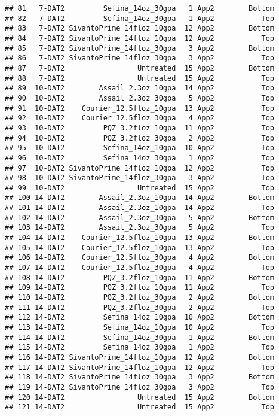 \documentclass[
]{article}
\begin{document}
\begin{verbatim}
## 81   7-DAT2         Sefina_14oz_30gpa   1 App2        Bottom
## 82   7-DAT2         Sefina_14oz_30gpa   1 App2           Top
## 83   7-DAT2 SivantoPrime_14floz_10gpa  12 App2        Bottom
## 84   7-DAT2 SivantoPrime_14floz_10gpa  12 App2           Top
## 85   7-DAT2 SivantoPrime_14floz_30gpa   3 App2        Bottom
## 86   7-DAT2 SivantoPrime_14floz_30gpa   3 App2           Top
## 87   7-DAT2                 Untreated  15 App2        Bottom
## 88   7-DAT2                 Untreated  15 App2           Top
## 89  10-DAT2        Assail_2.3oz_10gpa  14 App2           Top
## 90  10-DAT2        Assail_2.3oz_30gpa   5 App2           Top
## 91  10-DAT2    Courier_12.5floz_10gpa  13 App2           Top
## 92  10-DAT2    Courier_12.5floz_30gpa   4 App2           Top
## 93  10-DAT2         PQZ_3.2floz_10gpa  11 App2           Top
## 94  10-DAT2         PQZ_3.2floz_30gpa   2 App2           Top
## 95  10-DAT2         Sefina_14oz_10gpa  10 App2           Top
## 96  10-DAT2         Sefina_14oz_30gpa   1 App2           Top
## 97  10-DAT2 SivantoPrime_14floz_10gpa  12 App2           Top
## 98  10-DAT2 SivantoPrime_14floz_30gpa   3 App2           Top
## 99  10-DAT2                 Untreated  15 App2           Top
## 100 14-DAT2        Assail_2.3oz_10gpa  14 App2        Bottom
## 101 14-DAT2        Assail_2.3oz_10gpa  14 App2           Top
## 102 14-DAT2        Assail_2.3oz_30gpa   5 App2        Bottom
## 103 14-DAT2        Assail_2.3oz_30gpa   5 App2           Top
## 104 14-DAT2    Courier_12.5floz_10gpa  13 App2        Bottom
## 105 14-DAT2    Courier_12.5floz_10gpa  13 App2           Top
## 106 14-DAT2    Courier_12.5floz_30gpa   4 App2        Bottom
## 107 14-DAT2    Courier_12.5floz_30gpa   4 App2           Top
## 108 14-DAT2         PQZ_3.2floz_10gpa  11 App2        Bottom
## 109 14-DAT2         PQZ_3.2floz_10gpa  11 App2           Top
## 110 14-DAT2         PQZ_3.2floz_30gpa   2 App2        Bottom
## 111 14-DAT2         PQZ_3.2floz_30gpa   2 App2           Top
## 112 14-DAT2         Sefina_14oz_10gpa  10 App2        Bottom
## 113 14-DAT2         Sefina_14oz_10gpa  10 App2           Top
## 114 14-DAT2         Sefina_14oz_30gpa   1 App2        Bottom
## 115 14-DAT2         Sefina_14oz_30gpa   1 App2           Top
## 116 14-DAT2 SivantoPrime_14floz_10gpa  12 App2        Bottom
## 117 14-DAT2 SivantoPrime_14floz_10gpa  12 App2           Top
## 118 14-DAT2 SivantoPrime_14floz_30gpa   3 App2        Bottom
## 119 14-DAT2 SivantoPrime_14floz_30gpa   3 App2           Top
## 120 14-DAT2                 Untreated  15 App2        Bottom
## 121 14-DAT2                 Untreated  15 App2           Top

\end{verbatim}
\end{document}
